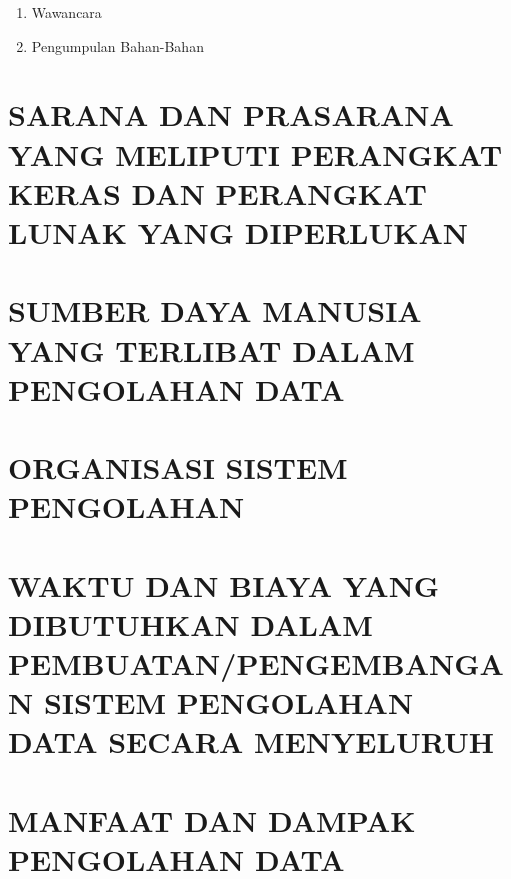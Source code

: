 \documentclass[pdftex,12pt, oneside]{article}
\begin{document}
\begin{enumerate}[1.]
\item Wawancara


\item Pengumpulan Bahan-Bahan

\end{enumerate}

\section{SARANA DAN PRASARANA YANG MELIPUTI PERANGKAT KERAS DAN PERANGKAT LUNAK YANG DIPERLUKAN}


\section{SUMBER DAYA MANUSIA YANG TERLIBAT DALAM PENGOLAHAN DATA}


\section{ORGANISASI SISTEM PENGOLAHAN}


\section{WAKTU DAN BIAYA YANG DIBUTUHKAN DALAM PEMBUATAN/PENGEMBANGAN SISTEM PENGOLAHAN DATA SECARA MENYELURUH}


\section{MANFAAT DAN DAMPAK PENGOLAHAN DATA}
\end{document}
